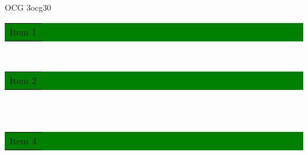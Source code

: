\documentclass[aspectratio=169]{beamer}
\begin{document}
\begin{frame}
{\begin{minipage}[t]{5cm}
\begin{ocg}{OCG 3}{ocg3}{0}
{{                                                                        \colorbox{green}{\normalsize 
                                                                            \begin{tabular}{m{4.3cm}} 
                                                                                Item 1
                                                                            \end{tabular}
                                                                        }\\%
                                                                        \colorbox{green}{\normalsize 
                                                                            \begin{tabular}{m{4.3cm}} 
                                                                                Item 2
                                                                            \end{tabular}
                                                                        }\\%
                                                                        \colorbox{red}{\normalsize {}}\\%
                                                                            \colorbox{green}{\normalsize 
                                                                                \begin{tabular}{m{4.3cm}} 
                                                                                    Item 4
                                                                                \end{tabular}
                                                                            }\\%
                                                                            \colorbox{red}{\normalsize {}}}}
\end{ocg}
\end{minipage}}
\end{frame}
\end{document}
